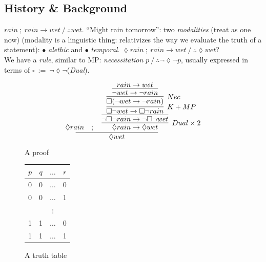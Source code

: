 \newcommand{\bisim}{\,\underline{\leftrightarrow}\,}
\newcommand{\cam}{\mathcal M}
\newcommand{\prop}{\mathcal P}
\newcommand{\ff}{\mathcal F}
\newcommand{\xx}{\mathcal X}
\newcommand{\iso}{\simeq}

\newcommand{\mm}{\mathcal M}
\newcommand{\eqcl}[1]{[\![#1]\!]}
\newcommand{\meq}{\leftrightsquigarrow}
\renewcommand{\qedsymbol}{\begin{large}$\ddot\circ$\end{large}}

\subsection{History \& Background}
$rain~;~rain\to wet~/~ \therefore wet$. ``Might rain tomorrow'': two \textit{modalities}  (treat as one now) (modality is a linguistic thing: relativizes the way we evaluate the truth of a statement): $\bullet$ \textit{alethic} and $\bullet$ \textit{temporal}.
$\lozenge rain ~;~ rain \to wet ~/~ \therefore \lozenge wet$?\\
We have a \textit{rule}, similar to MP: \textit{necessitation} $p ~/~\therefore \neg \lozenge \neg p$, usually expressed in terms of $\square ~:=~ \neg \lozenge \neg$(\textit{Dual}). 

\begin{figure}[ht]
\centering
\begin{minipage}[b]{0.45\linewidth}
$$\vcenter{\infer{\lozenge wet}{
  \lozenge rain \quad;\quad
  \infer[Dual \times 2]{\lozenge rain \to \lozenge wet}
        {
          \infer{\neg \square \neg rain \to \neg \square \neg wet}
                {
                  \infer[K + MP]{\square \neg wet \to \square \neg rain}
                        {
                          \infer[Nec]{\square(\neg wet \to \neg rain)}
                                {
                                  \infer{\neg wet \to \neg rain}
                                        {rain \to wet}
                                }
                        }
                }
        }
}}$$
\caption{A proof}
\end{minipage}
\begin{minipage}[b]{0.4\linewidth}
\begin{center}
\begin{tabular}{|c|c|c|c|} \hline
$p$ & $q$ & $\dots$ & $r$ \\ \hline
0 & 0 & $\dots$ & 0 \\ \hline
0 & 0 & $\dots$ & 1 \\ 
 & & $\vdots$ & \\
1 & 1 & $\dots$ & 0 \\ \hline
1 & 1 & $\dots$ & 1 \\ \hline
\end{tabular}
\end{center}
\caption{A truth table}
\end{minipage}
\end{figure}


